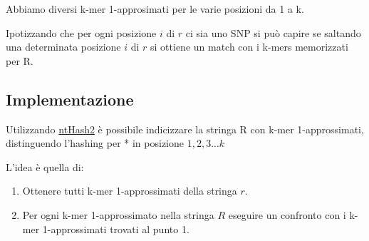 \documentclass{article}
\begin{document}
Abbiamo diversi k-mer 1-approsimati per le varie posizioni da 1 a k.

Ipotizzando che per ogni posizione $i$ di $r$ ci sia uno SNP si può capire se saltando una determinata posizione $i$ di $r$ si ottiene un match con i k-mers memorizzati per R.

\subsection{Implementazione}

Utilizzando  \href{https://github.com/bcgsc/ntHash}{ntHash2} è possibile indicizzare la stringa R con k-mer 1-approssimati, distinguendo l'hashing per * in posizione $1,2,3...k$


L'idea è quella di:

\begin{enumerate} 
 \item	Ottenere tutti k-mer 1-approssimati della stringa $r$.
 \item  Per ogni k-mer 1-approssimato nella stringa $R$ eseguire un confronto con i k-mer 1-approssimati trovati al punto 1.
\end{enumerate}
\end{document}
